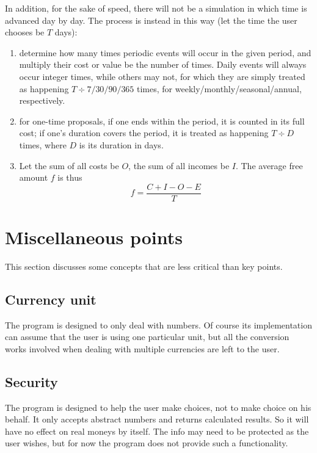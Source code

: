 In addition, for the sake of speed, there will not be a simulation in which time is advanced day by day. The process is instead in this way (let the time the user chooses be $T$ days):
\begin{enumerate}
	\item determine how many times periodic events will occur in the given period, and multiply their cost or value be the number of times. Daily events will always occur integer times, while others may not, for which they are simply treated as happening $T \div 7/30/90/365$ times, for weekly/monthly/seasonal/annual, respectively.
	\item for one-time proposals, if one ends within the period, it is counted in its full cost; if one's duration covers the period, it is treated as happening $T \div D$ times, where $D$ is its duration in days.
	\item Let the sum of all costs be $O$, the sum of all incomes be $I$. The average free amount $f$ is thus
	\[
	f = \frac{C + I - O - E}{T}
	\]
\end{enumerate}

\section{Miscellaneous points}
This section discusses some concepts that are less critical than key points.

\subsection{Currency unit}
The program is designed to only deal with numbers. Of course its implementation can assume that the user is using one particular unit, but all the conversion works involved when dealing with multiple currencies are left to the user.

\subsection{Security}
The program is designed to help the user make choices, not to make choice on his behalf. It only accepts abstract numbers and returns calculated results. So it will have no effect on real moneys by itself. The info may need to be protected as the user wishes, but for now the program does not provide such a functionality.